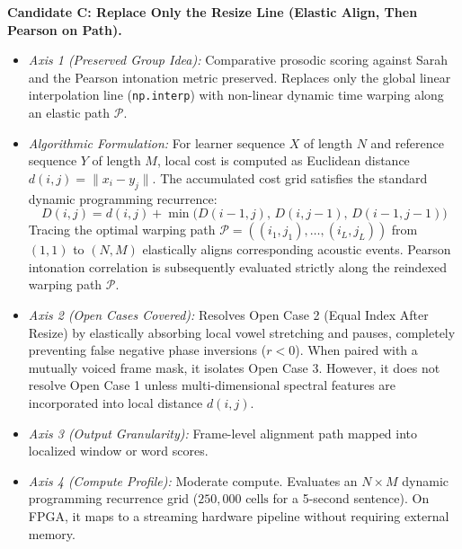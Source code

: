 \documentclass[11pt,a4paper]{article}
\begin{document}
\textbf{Candidate C: Replace Only the Resize Line (Elastic Align, Then Pearson on Path).}
\begin{itemize}
    \item \textit{Axis 1 (Preserved Group Idea):} Comparative prosodic scoring against Sarah and the Pearson intonation metric preserved. Replaces only the global linear interpolation line (\texttt{np.interp}) with non-linear dynamic time warping along an elastic path $\mathcal{P}$.
    \item \textit{Algorithmic Formulation:} For learner sequence $X$ of length $N$ and reference sequence $Y$ of length $M$, local cost is computed as Euclidean distance $d(i, j) = \|x_i - y_j\|$. The accumulated cost grid satisfies the standard dynamic programming recurrence:
    \begin{equation}
    D(i, j) = d(i, j) + \min\big(D(i-1, j),\, D(i, j-1),\, D(i-1, j-1)\big)
    \label{eq:dtw_recurrence}
    \end{equation}
    Tracing the optimal warping path $\mathcal{P} = ((i_1, j_1), \dots, (i_L, j_L))$ from $(1, 1)$ to $(N, M)$ elastically aligns corresponding acoustic events. Pearson intonation correlation is subsequently evaluated strictly along the reindexed warping path $\mathcal{P}$.
    \item \textit{Axis 2 (Open Cases Covered):} Resolves Open Case 2 (Equal Index After Resize) by elastically absorbing local vowel stretching and pauses, completely preventing false negative phase inversions ($r < 0$). When paired with a mutually voiced frame mask, it isolates Open Case 3. However, it does not resolve Open Case 1 unless multi-dimensional spectral features are incorporated into local distance $d(i, j)$.
    \item \textit{Axis 3 (Output Granularity):} Frame-level alignment path mapped into localized window or word scores.
    \item \textit{Axis 4 (Compute Profile):} Moderate compute. Evaluates an $N \times M$ dynamic programming recurrence grid ($250,000\text{ cells}$ for a 5-second sentence). On FPGA, it maps to a streaming hardware pipeline without requiring external memory.
\end{itemize}
\end{document}

